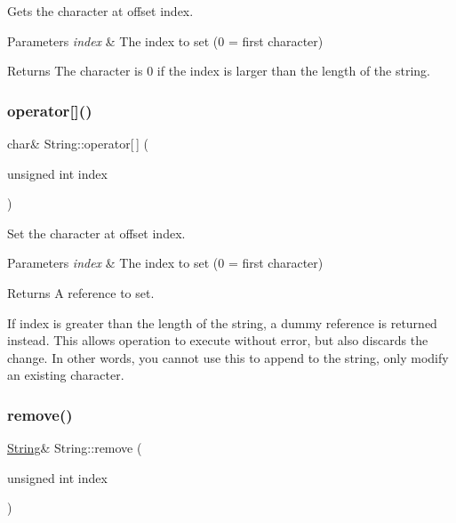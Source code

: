 Gets the character at offset index. 


\begin{DoxyParams}{Parameters}
{\em index} & The index to set (0 = first character)\\
\hline
\end{DoxyParams}
\begin{DoxyReturn}{Returns}
The character is 0 if the index is larger than the length of the string. 
\end{DoxyReturn}
\mbox{\label{class_string_a0c9922e5854f82cd9952fcb4d6006059}} 
\subsubsection{\texorpdfstring{operator[]()}{operator[]()}\hspace{0.1cm}{\footnotesize\ttfamily [2/2]}}
{\footnotesize\ttfamily char\& String\+::operator\mbox{[}$\,$\mbox{]} (\begin{DoxyParamCaption}\item[{unsigned int}]{index }\end{DoxyParamCaption})}



Set the character at offset index. 


\begin{DoxyParams}{Parameters}
{\em index} & The index to set (0 = first character)\\
\hline
\end{DoxyParams}
\begin{DoxyReturn}{Returns}
A reference to set.
\end{DoxyReturn}
If index is greater than the length of the string, a dummy reference is returned instead. This allows operation to execute without error, but also discards the change. In other words, you cannot use this to append to the string, only modify an existing character. \mbox{\label{class_string_ae65cdfb8e1bf70458d3d699c27754a9b}} 
\subsubsection{\texorpdfstring{remove()}{remove()}\hspace{0.1cm}{\footnotesize\ttfamily [1/2]}}
{\footnotesize\ttfamily \hyperlink{class_string}{String}\& String\+::remove (\begin{DoxyParamCaption}\item[{unsigned int}]{index }\end{DoxyParamCaption})}



